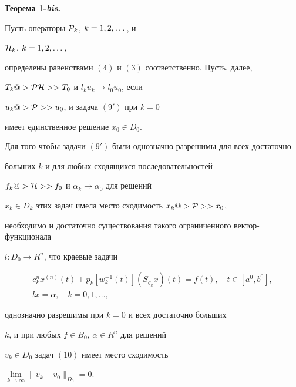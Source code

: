 {\bf Теорема 1-{\it bis}.} {\it


Пусть операторы ${\cal P}_k$, $k=1,2,\dotsc$, и


${\cal H}_k$, $k=1,2,\dotsc$,


определены равенствами $(4)$ и $(3)$ соответственно. Пусть, далее,


$T_k@>{{\cal P}{\cal H}}>> T_0$ и $l_ku_k\longrightarrow l_0u_0$, если


$u_k @>{\cal P}>> u_0$, и задача $(9')$ при $k=0$


имеет единственное решение $x_0\in D_0$.


Для того чтобы задачи $(9')$ были однозначно разрешимы для всех достаточно


больших $k$ и для любых сходящихся последовательностей


$f_k@>{\cal H}>> f_0$ и $\alpha_k\longrightarrow\alpha_0$ для решений


$x_k\in D_k$ этих задач имела место сходимость $x_k@>{\cal P}>> x_0$,


необходимо и достаточно существования такого ограниченного вектор-функционала


$l:D_0\to R^n$, что краевые задачи


\begin{equation}


\begin{array}{c}


c^n_k x^{(n)}(t) +


p_k[w_k^{-1}(t)] (S_{g_k}x)(t) = f(t),\quad t\in[a^0,b^0],\\[2mm]


lx=\alpha,\quad k=0,1,\dotsc,


\end{array}


\end{equation}


однозначно разрешимы при $k=0$ и всех достаточно больших


$k$, и при любых $f\in B_0$, $\alpha\in R^n$ для решений


$v_k\in D_0$ задач $(10)$ имеет место сходимость


$\lim\limits_{k\to\infty} \|v_k-v_0\|_{D_0} =0$.


}





